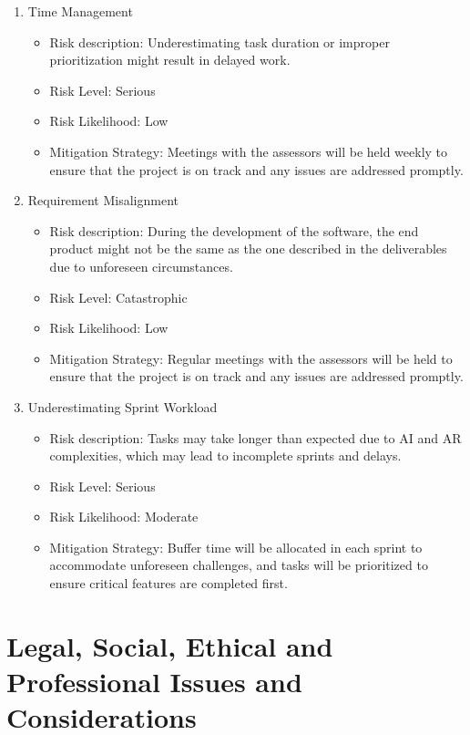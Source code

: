 \documentclass[12pt]{article}
\begin{document}
\begin{enumerate}
        \item{Time Management}
        \begin{itemize}
            \item Risk description: Underestimating  task duration or improper prioritization might result in delayed work.
            \item Risk Level: Serious
            \item Risk Likelihood: Low
            \item Mitigation Strategy: Meetings with the assessors will be held weekly to ensure that the project is on track and any issues are addressed promptly.
        \end{itemize}

        \item{Requirement Misalignment}
        \begin{itemize}
            \item Risk description: During the development of the software, the end product might not be the same as the one described in the deliverables due to unforeseen circumstances.
            \item Risk Level: Catastrophic
            \item Risk Likelihood: Low
            \item Mitigation Strategy: Regular meetings with the assessors will be held to ensure that the project is on track and any issues are addressed promptly.
        \end{itemize}

        \item{Underestimating Sprint Workload}
        \begin{itemize}
            \item Risk description: Tasks may take longer than expected due to AI and AR complexities, which may lead to incomplete sprints and delays.
            \item Risk Level: Serious
            \item Risk Likelihood: Moderate
            \item Mitigation Strategy: Buffer time will be allocated in each sprint to accommodate unforeseen challenges, and tasks will be prioritized to ensure critical features are completed first.
        \end{itemize}

        \end{enumerate}
        

\section{Legal, Social, Ethical and Professional Issues and Considerations}
\end{document}
